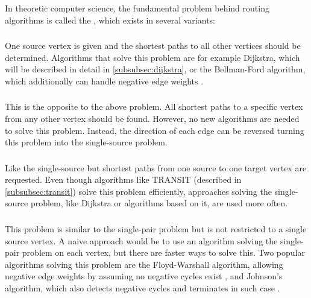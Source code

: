 		In theoretic computer science, the fundamental problem behind routing algorithms is called the , which exists in several variants\cite[644]{cormen-introduction-to-alg}:
		
		\subsubsection{}
		\label{subsubsec:single-source-shortest-path}
		
			One source vertex is given and the shortest paths to all other vertices should be determined.
			Algorithms that solve this problem are for example Dijkstra, which will be described in detail in \cref{subsubsec:dijkstra}, or the Bellman-Ford algorithm, which additionally can handle negative edge weights \cite[651]{cormen-introduction-to-alg}.
		
		\subsubsection{}
		
			This is the opposite to the above problem.
			All shortest paths to a specific vertex from any other vertex should be found.
			However, no new algorithms are needed to solve this problem.
			Instead, the direction of each edge can be reversed turning this problem into the single-source problem.
		
		\subsubsection{}
		
			Like the single-source but shortest paths from one source to one target vertex are requested.
			Even though algorithms like TRANSIT (described in \cref{subsubsec:transit}) solve this problem efficiently, approaches solving the single-source problem, like Dijkstra or algorithms based on it, are used more often.
		
		\subsubsection{}
		\label{subsubsec:all-pair-shortest-path}
		
			This problem is similar to the single-pair problem but is not restricted to a single source vertex.
			A naive approach would be to use an algorithm solving the single-pair problem on each vertex, but there are faster ways to solve this.
			Two popular algorithms solving this problem are the Floyd-Warshall algorithm, allowing negative edge weights by assuming no negative cycles exist \cite[693]{cormen-introduction-to-alg}, and Johnson's algorithm, which also detects negative cycles and terminates in such case \cite[700]{cormen-introduction-to-alg}.
		
